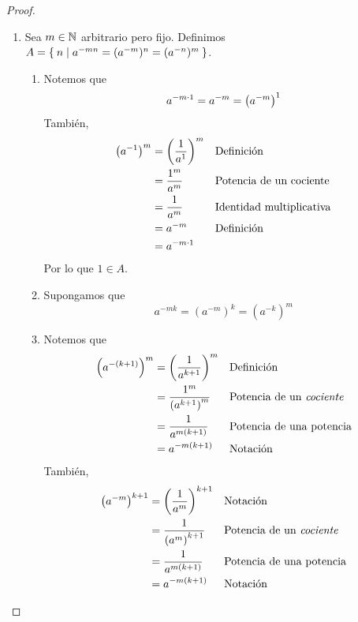 \begin{enumerate}[label=\alph*)]
\begin{proof}
\begin{enumerate}[label=\Roman*)]
      \item Sea $m\in \mathbb{N}$ arbitrario pero fijo. Definimos $A=\Set{n|a^{-mn}=(a^{-m})^n=(a^{-n})^m}$.
      \begin{enumerate}[label=\roman*)]
        \item Notemos que \[a^{-m\cdot 1} = a^{-m} = \qty(a^{-m})^1\]
        También,
        \begin{align*}
          \qty(a^{-1})^m &= \left(\frac{1}{a^1}\right)^m && \text{Definición}\\
          &= \frac{1^m}{a^m} && \text{Potencia de un \text{cociente}}\\
          &= \frac{1}{a^m} && \text{Identidad multiplicativa}\\
          &= a^{-m} && \text{Definición}\\
          &= a^{-m\cdot 1}
        \end{align*}
        Por lo que $1\in A$.
        \item Supongamos que \[a^{-mk}=(a^{-m})^k=(a^{-k})^m\]
        \item Notemos que
        \begin{align*}
          \qty(a^{-(k+1)})^m &= \left(\frac{1}{a^{k+1}}\right)^m && \text{Definición}\\
          &= \frac{1^m}{\qty(a^{k+1})^m} && \text{Potencia de un \textit{cociente}}\\
          &= \frac{1}{a^{m(k+1)}} && \text{Potencia de una potencia}\\
          &= a^{-m(k+1)} && \text{Notación}
        \end{align*}
        También,
        \begin{align*}
          \qty(a^{-m})^{k+1} &= \left(\frac{1}{a^{m}}\right)^{k+1}&& \text{Notación}\\
          &= \frac{1}{\qty(a^{m})^{k+1}} && \text{Potencia de un \textit{cociente}}\\
          &= \frac{1}{a^{m(k+1)}} && \text{Potencia de una potencia}\\
          &= a^{-m(k+1)} && \text{Notación}
        \end{align*}
      \end{enumerate}
    \end{enumerate}
  \end{proof}
  

\end{enumerate}
